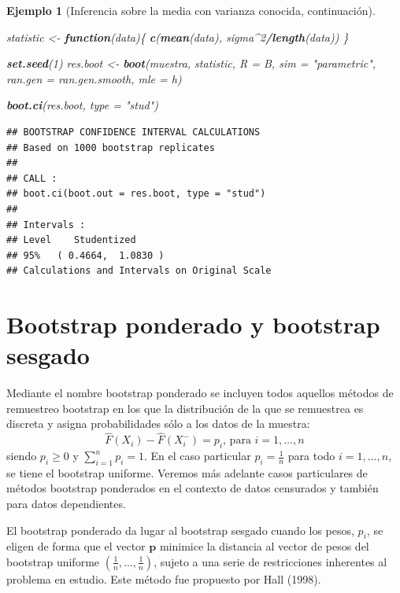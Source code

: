 \documentclass[
]{book}
\newenvironment{Shaded}{\begin{snugshade}}{\end{snugshade}}
\newcommand{\AttributeTok}[1]{\textcolor[rgb]{0.13,0.29,0.53}{#1}}
\newcommand{\ControlFlowTok}[1]{\textcolor[rgb]{0.13,0.29,0.53}{\textbf{#1}}}
\newcommand{\DecValTok}[1]{\textcolor[rgb]{0.00,0.00,0.81}{#1}}
\newcommand{\FunctionTok}[1]{\textcolor[rgb]{0.13,0.29,0.53}{\textbf{#1}}}
\newcommand{\NormalTok}[1]{#1}
\newcommand{\OtherTok}[1]{\textcolor[rgb]{0.56,0.35,0.01}{#1}}
\newcommand{\SpecialCharTok}[1]{\textcolor[rgb]{0.81,0.36,0.00}{\textbf{#1}}}
\newcommand{\StringTok}[1]{\textcolor[rgb]{0.31,0.60,0.02}{#1}}
\renewcommand{\mathbf}[1]{\symbf{#1}}
\theoremstyle{break}
\newtheorem{example}{Ejemplo}[chapter]
\theoremstyle{nonumberplain}
\begin{document}
\begin{example}[Inferencia sobre la media con varianza conocida, continuación]
\begin{Shaded}
\begin{Highlighting}[]
\NormalTok{statistic }\OtherTok{\textless{}{-}} \ControlFlowTok{function}\NormalTok{(data)\{}
    \FunctionTok{c}\NormalTok{(}\FunctionTok{mean}\NormalTok{(data), sigma}\SpecialCharTok{\^{}}\DecValTok{2}\SpecialCharTok{/}\FunctionTok{length}\NormalTok{(data))}
\NormalTok{\}}

\FunctionTok{set.seed}\NormalTok{(}\DecValTok{1}\NormalTok{)}
\NormalTok{res.boot }\OtherTok{\textless{}{-}} \FunctionTok{boot}\NormalTok{(muestra, statistic, }\AttributeTok{R =}\NormalTok{ B, }\AttributeTok{sim =} \StringTok{"parametric"}\NormalTok{,}
                 \AttributeTok{ran.gen =}\NormalTok{ ran.gen.smooth, }\AttributeTok{mle =}\NormalTok{ h)}

\FunctionTok{boot.ci}\NormalTok{(res.boot, }\AttributeTok{type =} \StringTok{"stud"}\NormalTok{)}
\end{Highlighting}
\end{Shaded}

\begin{verbatim}
## BOOTSTRAP CONFIDENCE INTERVAL CALCULATIONS
## Based on 1000 bootstrap replicates
## 
## CALL : 
## boot.ci(boot.out = res.boot, type = "stud")
## 
## Intervals : 
## Level    Studentized     
## 95%   ( 0.4664,  1.0830 )  
## Calculations and Intervals on Original Scale
\end{verbatim}

\end{example}

\section{Bootstrap ponderado y bootstrap sesgado}\label{bootstrap-ponderado-y-bootstrap-sesgado}

Mediante el nombre bootstrap ponderado se incluyen todos aquellos
métodos de remuestreo bootstrap en los que la distribución de la que se
remuestrea es discreta y asigna probabilidades sólo a los datos de la
muestra:
\[\hat{F}\left( X_i \right) -\hat{F}\left( X_i^{-} \right) = p_i
\text{, para }i=1,\ldots, n\]
siendo \(p_i\geq 0\) y \(\sum_{i=1}^{n}p_i=1\). En el caso particular \(p_i=
\frac{1}{n}\) para todo \(i=1,\ldots ,n\), se tiene el bootstrap uniforme.
Veremos más adelante casos particulares de métodos bootstrap ponderados
en el contexto de datos censurados y también para datos dependientes.

El bootstrap ponderado da lugar al bootstrap sesgado cuando los pesos,
\(p_i\), se eligen de forma que el vector \(\mathbf{p}\) minimice
la distancia al vector de pesos del bootstrap uniforme
\(\left( \frac{1}{n},\ldots ,\frac{1}{n} \right)\),
sujeto a una serie de restricciones inherentes al problema en estudio.
Este método fue propuesto por Hall (1998).
\end{document}
